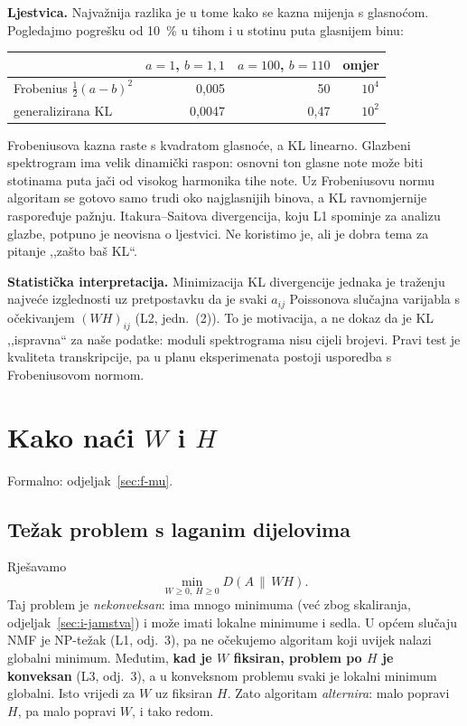 \documentclass[11pt,a4paper]{article}
\theoremstyle{definition}
\theoremstyle{plain}
\theoremstyle{remark}
\newcommand{\Dkl}[2]{D(#1\,\|\,#2)}
\newcommand{\formalno}[1]{{\small\color{muted}\sffamily Formalno: odjeljak~\ref{#1}.}\par}
\begin{document}
\textbf{Ljestvica.} Najvažnija razlika je u tome kako se kazna mijenja s glasnoćom. Pogledajmo
pogrešku od 10~\% u tihom i u stotinu puta glasnijem binu:

\begin{center}
\small
\begin{tabular}{@{}lrrr@{}}
\toprule
& $a=1$, $b=1{,}1$ & $a=100$, $b=110$ & omjer\\
\midrule
Frobenius $\tfrac12(a-b)^2$ & 0,005 & 50 & $10^4$\\
generalizirana KL & 0,0047 & 0,47 & $10^2$\\
\bottomrule
\end{tabular}
\end{center}

Frobeniusova kazna raste s kvadratom glasnoće, a KL linearno. Glazbeni spektrogram ima velik
dinamički raspon: osnovni ton glasne note može biti stotinama puta jači od visokog harmonika tihe
note. Uz Frobeniusovu normu algoritam se gotovo samo trudi oko najglasnijih binova, a KL ravnomjernije
raspoređuje pažnju. Itakura–Saitova divergencija, koju L1 spominje za analizu glazbe, potpuno je
neovisna o ljestvici. Ne koristimo je, ali je dobra tema za pitanje ,,zašto baš KL``.

\textbf{Statistička interpretacija.} Minimizacija KL divergencije jednaka je traženju najveće
izglednosti uz pretpostavku da je svaki $a_{ij}$ Poissonova slučajna varijabla s očekivanjem
$(WH)_{ij}$ (L2, jedn.~(2)). To je motivacija, a ne dokaz da je KL ,,ispravna`` za naše podatke:
moduli spektrograma nisu cijeli brojevi. Pravi test je kvaliteta transkripcije, pa u planu
eksperimenata postoji usporedba s Frobeniusovom normom.

\section{Kako naći \texorpdfstring{$W$}{W} i \texorpdfstring{$H$}{H}}\label{sec:i-algoritam}
\formalno{sec:f-mu}

\subsection{Težak problem s laganim dijelovima}

Rješavamo
\[
  \min_{W\geq0,\ H\geq0} \Dkl{A}{WH}.
\]
Taj problem je \emph{nekonveksan}: ima mnogo minimuma (već zbog skaliranja, odjeljak~\ref{sec:i-jamstva})
i može imati lokalne minimume i sedla. U općem slučaju NMF je NP-težak (L1, odj.~3), pa ne
očekujemo algoritam koji uvijek nalazi globalni minimum. Međutim, \textbf{kad je $W$ fiksiran,
problem po $H$ je konveksan} (L3, odj.~3), a u konveksnom problemu svaki je lokalni minimum
globalni. Isto vrijedi za $W$ uz fiksiran $H$. Zato algoritam \emph{alternira}: malo popravi $H$,
pa malo popravi $W$, i tako redom.
\end{document}

